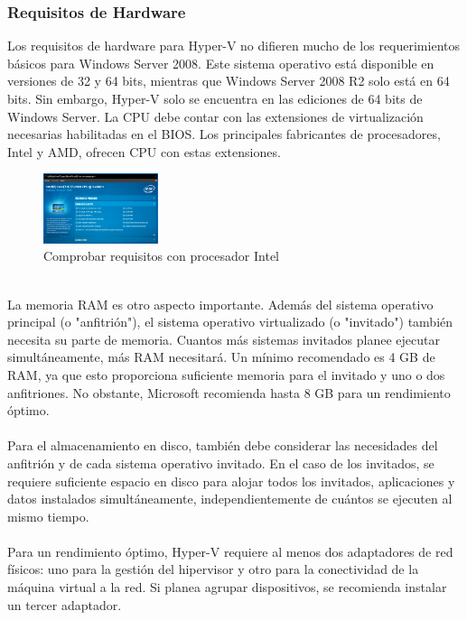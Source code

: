 \documentclass[journal]{IEEEtran}
\begin{document}
\subsubsection{Requisitos de Hardware}
\begin{par}
Los requisitos de hardware para Hyper-V no difieren mucho de los requerimientos básicos para Windows Server 2008. Este sistema operativo está disponible en versiones de 32 y 64 bits, mientras que Windows Server 2008 R2 solo está en 64 bits. Sin embargo, Hyper-V solo se encuentra en las ediciones de 64 bits de Windows Server. La CPU debe contar con las extensiones de virtualización necesarias habilitadas en el BIOS. Los principales fabricantes de procesadores, Intel y AMD, ofrecen CPU con estas extensiones.\cite{OLZAK201029}
\begin{figure}[htbp]
  \centering
  \includegraphics[width=0.3\textwidth]{Comprobacion-Intel.PNG}
  \caption{Comprobar requisitos con procesador Intel}
\end{figure}
\\
La memoria RAM es otro aspecto importante. Además del sistema operativo principal (o "anfitrión"), el sistema operativo virtualizado (o "invitado") también necesita su parte de memoria. Cuantos más sistemas invitados planee ejecutar simultáneamente, más RAM necesitará. Un mínimo recomendado es 4 GB de RAM, ya que esto proporciona suficiente memoria para el invitado y uno o dos anfitriones. No obstante, Microsoft recomienda hasta 8 GB para un rendimiento óptimo.\cite{OLZAK201029}\\ \\
Para el almacenamiento en disco, también debe considerar las necesidades del anfitrión y de cada sistema operativo invitado. En el caso de los invitados, se requiere suficiente espacio en disco para alojar todos los invitados, aplicaciones y datos instalados simultáneamente, independientemente de cuántos se ejecuten al mismo tiempo.\cite{OLZAK201029}\\ \\
Para un rendimiento óptimo, Hyper-V requiere al menos dos adaptadores de red físicos: uno para la gestión del hipervisor y otro para la conectividad de la máquina virtual a la red. Si planea agrupar dispositivos, se recomienda instalar un tercer adaptador.\cite{OLZAK201029}
\end{par}
\end{document}
